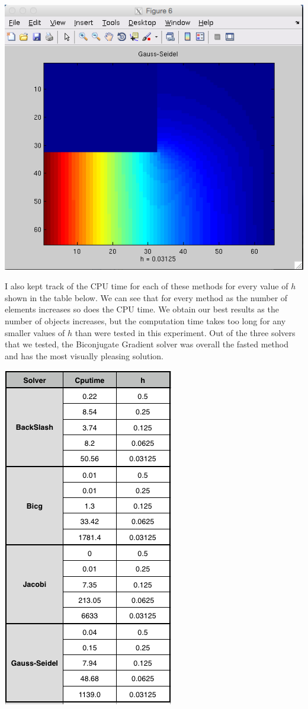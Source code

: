 \documentclass[11pt, oneside]{article}   	%
\begin{document}
\centerline{\includegraphics[scale = 0.55]{Gauss_h5.png}}

I also kept track of the CPU time for each of these methods for every value of $h$ shown in the table below. We can see that for every method as the number of elements increases so does the CPU time. We obtain our best results as the number of objects increases, but the computation time takes too long for any smaller values of $h$ than were tested in this experiment. Out of the three solvers that we tested, the Biconjugate Gradient solver was overall the fasted method and has the most visually pleasing solution. \\

\centerline{\includegraphics[scale = 0.75]{SolversComparisonTable.png}}
\end{document}
